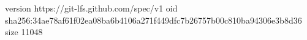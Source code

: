version https://git-lfs.github.com/spec/v1
oid sha256:34ae78af61f02ea08ba6b4106a271f449dfc7b26757b00c810ba94306e3b8d36
size 11048
